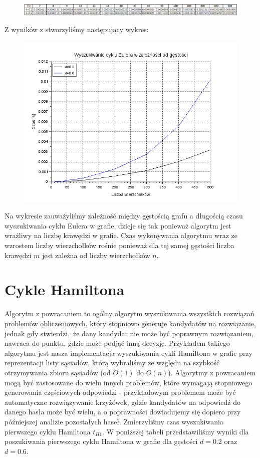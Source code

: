 \documentclass{article}
\begin{document}
\begin{figure}[h!]
\centering
  \includegraphics[width=1.0\linewidth]{zad3_tabela.png}
\end{figure}%

Z wyników z stworzyliśmy następujący wykres:

\begin{figure}[h!]
\centering
  \includegraphics[width=0.5\linewidth]{zad3_wykres.png}
\end{figure}%

Na wykresie zauważyliśmy zależność między gęstością grafu a długością czasu wyszukiwania cyklu Eulera w grafie, dzieje się tak ponieważ algorytm jest wrażliwy na liczbę krawędzi w grafie. Czas wykonywania algorytmu wraz ze wzrostem liczby wierzchołków rośnie ponieważ dla tej samej gęstości liczba krawędzi $m$ jest zależna od liczby wierzchołków $n$.

\pagebreak

\section{Cykle Hamiltona}

Algorytm z powracaniem to ogólny algorytm wyszukiwania wszystkich rozwiązań problemów obliczeniowych, który stopniowo generuje kandydatów na rozwiązanie, jednak gdy stwierdzi, że dany kandydat nie może być poprawnym rozwiązaniem, nawraca do punktu, gdzie może podjąć inną decyzję. Przykładem takiego algorytmu jest nasza implementacja wyszukiwania cykli Hamiltona w grafie przy reprezentacji listy sąsiadów, którą wybraliśmy ze względu na szybkość otrzymywania zbioru sąsiadów (od $O(1)$ do $O(n)$). Algorytmy z powracaniem mogą być zastosowane do wielu innych problemów, które wymagają stopniowego generowania częściowych odpowiedzi - przykładowym problemem może być automatyczne rozwiązywanie krzyżówek, gdzie kandydatów na odpowiedź do danego hasła może być wielu, a o poprawności dowiadujemy się dopiero przy późniejszej analizie pozostałych haseł. Zmierzyliśmy czas wyszukiwania pierwszego cyklu Hamiltona $t_{H1}$. W poniższej tabeli przedstawiliśmy wyniki dla poszukiwania pierwszego cyklu Hamiltona w grafie dla gęstości $d=0.2$ oraz $d=0.6$.
\end{document}
